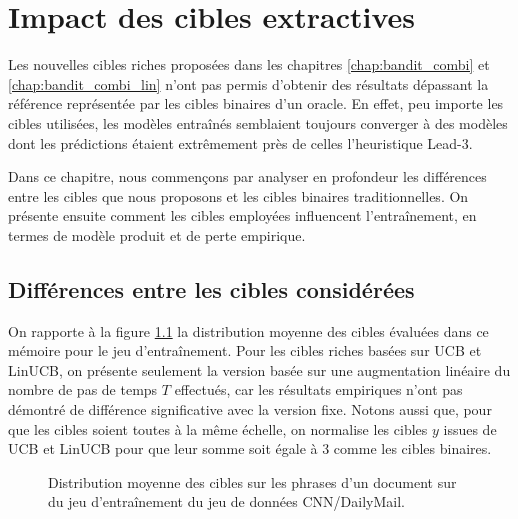 \chapter{Impact des cibles extractives}
\label{chap:analyse_convergemce}   

Les nouvelles cibles riches proposées dans les chapitres 
\ref{chap:bandit_combi} et \ref{chap:bandit_combi_lin}
n'ont pas permis d'obtenir des résultats dépassant 
la référence représentée par les cibles binaires d'un oracle.
En effet, peu importe les cibles utilisées, les modèles entraînés
semblaient toujours converger à des modèles dont les prédictions 
étaient extrêmement près de celles l'heuristique Lead-3.

Dans ce chapitre, nous commençons par analyser 
en profondeur les différences entre les cibles que nous proposons 
et les cibles binaires traditionnelles.
On présente ensuite comment les cibles employées influencent 
l'entraînement, en termes de modèle produit et de 
perte empirique.

\section{Différences entre les cibles considérées}

On rapporte à la figure \ref{fig:distro_cibles} la distribution moyenne
des cibles évaluées dans ce mémoire pour le jeu d'entraînement.
Pour les cibles riches basées sur UCB et LinUCB, on présente seulement la version 
basée sur une augmentation linéaire du nombre de pas de temps $T$ effectués, car
les résultats empiriques n'ont pas démontré de différence significative avec la
version fixe.
Notons aussi que, pour que les cibles soient toutes à la même échelle, on 
normalise les cibles $y$ issues de UCB et LinUCB pour que leur somme soit égale à 
3 comme les cibles binaires.

\begin{figure}[h!]
  \centering
  \caption{Distribution moyenne des cibles sur les phrases 
  d'un document sur du jeu d'entraînement du jeu de données CNN/DailyMail.}
  \label{fig:distro_cibles}
\end{figure}

